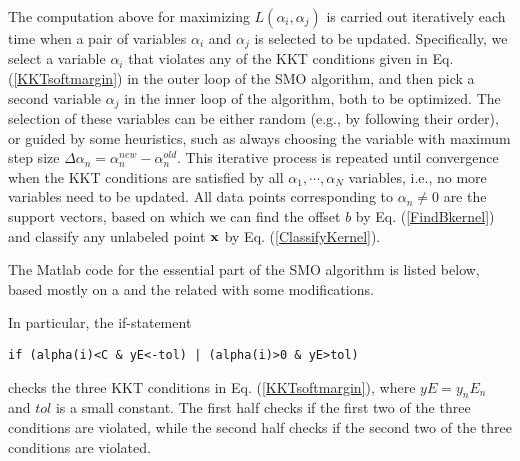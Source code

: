 \documentclass{article}
\begin{document}
The computation above for maximizing $L(\alpha_i,\alpha_j)$ is 
carried out iteratively each time when a pair of variables $\alpha_i$ 
and $\alpha_j$ is selected to be updated. Specifically, we select a
variable $\alpha_i$ that violates any of the KKT conditions given in 
Eq. (\ref{KKTsoftmargin}) in the outer loop of the SMO algorithm, 
and then pick a second variable $\alpha_j$ in the inner loop of the 
algorithm, both to be optimized. The selection of these variables can 
be either random (e.g., by following their order), or guided by some 
heuristics, such as always choosing the variable with maximum step 
size $\Delta\alpha_n=\alpha^{new}_n-\alpha^{old}_n$. This iterative 
process is repeated until convergence when the KKT conditions are 
satisfied by all $\alpha_1,\cdots,\alpha_N$ variables, i.e., no 
more variables need to be updated. All data points corresponding to 
$\alpha_n\ne 0$ are the support vectors, based on which we can find 
the offset $b$ by Eq. (\ref{FindBkernel}) and classify any unlabeled 
point ${\bf x}$ by Eq. (\ref{ClassifyKernel}).

The Matlab code for the essential part of the SMO algorithm is listed 
below, based mostly on a  and the related
with some modifications. 

In particular, the if-statement 
\begin{verbatim} 
if (alpha(i)<C & yE<-tol) | (alpha(i)>0 & yE>tol) 
\end{verbatim}
checks the three KKT conditions in Eq. (\ref{KKTsoftmargin}), where 
$yE=y_nE_n$ and $tol$ is a small constant. The first half checks if
the first two of the three conditions are violated, while the second
 half checks if the second two of the three conditions are violated. 
\end{document}
